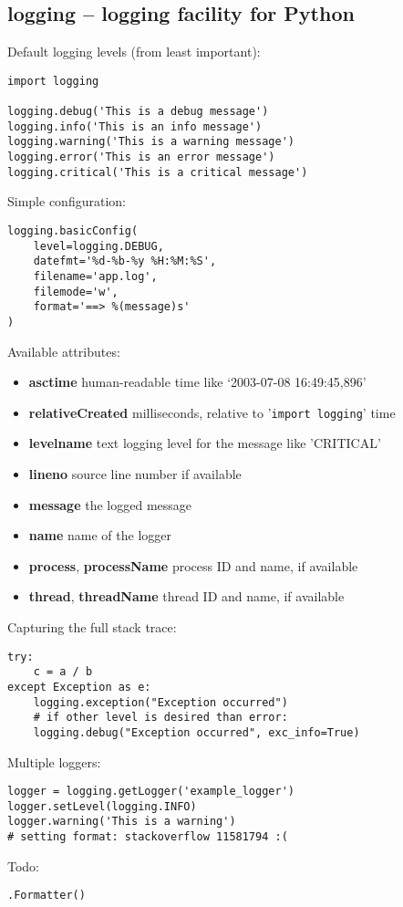 \subsection{logging -- logging facility for Python}
Default logging levels (from least important):
\begin{verbatim}
import logging

logging.debug('This is a debug message')
logging.info('This is an info message')
logging.warning('This is a warning message')
logging.error('This is an error message')
logging.critical('This is a critical message')
\end{verbatim}

Simple configuration:
\begin{verbatim}
logging.basicConfig(
    level=logging.DEBUG,
    datefmt='%d-%b-%y %H:%M:%S',
    filename='app.log',
    filemode='w',
    format='==> %(message)s'
)
\end{verbatim}

Available attributes:
\begin{itemize}
	\item \textbf{asctime} human-readable time like ‘2003-07-08 16:49:45,896’
	\item \textbf{relativeCreated} milliseconds, relative to '\texttt{import logging}' time
	\item \textbf{levelname} text logging level for the message like 'CRITICAL'
	\item \textbf{lineno} source line number if available
	\item \textbf{message} the logged message
	\item \textbf{name} name of the logger
	\item \textbf{process}, \textbf{processName} process ID and name, if available
	\item \textbf{thread}, \textbf{threadName} thread ID and name, if available
\end{itemize}

Capturing the full stack trace:
\begin{verbatim}
try:
    c = a / b
except Exception as e:
    logging.exception("Exception occurred")
    # if other level is desired than error:
    logging.debug("Exception occurred", exc_info=True)
\end{verbatim}

Multiple loggers:
\begin{verbatim}
logger = logging.getLogger('example_logger')
logger.setLevel(logging.INFO)
logger.warning('This is a warning')
# setting format: stackoverflow 11581794 :(
\end{verbatim}

Todo:
\begin{verbatim}
.Formatter()
\end{verbatim}